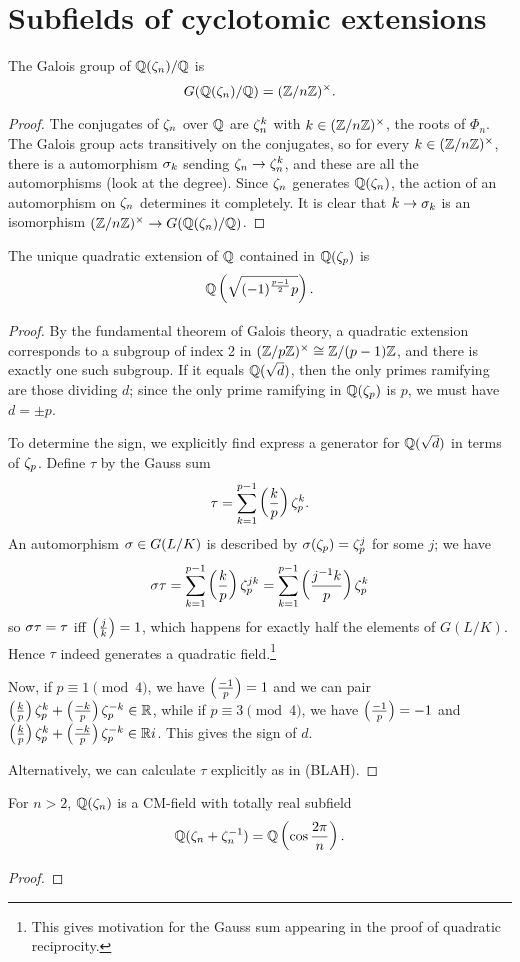\section{Subfields of cyclotomic extensions}
\begin{pr}
The Galois group of $\mathbb{Q}(\zeta_n)/\mathbb{Q}$ is
\[
G(\mathbb{Q}(\zeta_n)/\mathbb{Q})=(\mathbb{Z}/n\mathbb{Z})^{\times}.
\]
\end{pr}
\begin{proof}
The conjugates of $\zeta_n$ over $\mathbb{Q}$ are $\zeta_n^k$ with $k\in (\mathbb{Z}/n\mathbb{Z})^{\times}$, the roots of $\Phi_n$. The Galois group acts transitively on the conjugates, so for every $k\in (\mathbb{Z}/n\mathbb{Z})^{\times}$, there is a automorphism $\sigma_k$ sending $\zeta_n\to \zeta_n^k$, and these are all the automorphisms (look at the degree). Since $\zeta_n$ generates $\mathbb{Q}(\zeta_n)$, the action of an automorphism on $\zeta_n$ determines it completely. It is clear that $k\to \sigma_k$ is an isomorphism $(\mathbb{Z}/n\mathbb{Z})^{\times}\to G(\mathbb{Q}(\zeta_n)/\mathbb{Q})$.
\end{proof}
\begin{pr}
The unique quadratic extension of $\mathbb{Q}$ contained in $\mathbb{Q}(\zeta_p)$ is
\[
\mathbb{Q}\left( {\sqrt{(-1)^{\frac{p-1}{2}}p}} \right).
\]
\end{pr}
\begin{proof}
By the fundamental theorem of Galois theory, a quadratic extension corresponds to a subgroup of index 2 in $(\mathbb{Z}/p\mathbb{Z})^{\times}\cong \mathbb{Z}/(p-1)\mathbb{Z}$, and there is exactly one such subgroup. If it equals $\mathbb{Q}(\sqrt{d})$, then the only primes ramifying are those dividing $d$; since the only prime ramifying in $\mathbb{Q}(\zeta_p)$ is $p$, we must have $d=\pm p$.

To determine the sign, we explicitly find express a generator for $\mathbb{Q}(\sqrt{d})$ in terms of $\zeta_p$. Define $\tau$ by the Gauss sum
\[
\tau=\sum_{k=1}^{p-1} \left( {\frac{k}{p}} \right)\zeta_p^k.
\]
An automorphism $\sigma\in G(L/K)$ is described by $\sigma(\zeta_p)=\zeta_p^j$ for some $j$; we have
\[
\sigma \tau=\sum_{k=1}^{p-1} \left( {\frac{k}{p}} \right)\zeta_p^{jk}
=\sum_{k=1}^{p-1} \left( {\frac{j^{-1}k}{p}} \right)\zeta_p^{k}
\]
so $\sigma\tau=\tau$ iff $\left( {\frac{j}{k}} \right)=1$, which happens for exactly half the elements of $G(L/K)$. Hence $\tau$ indeed generates a quadratic field.\footnote{This gives motivation for the Gauss sum appearing in the proof of quadratic reciprocity.}

Now, if $p\equiv 1\pmod 4$, we have $\left( {\frac{-1}{p}} \right)=1$ and we can pair $\left( {\frac{k}{p}} \right)\zeta_p^k+\left( {\frac{-k}{p}} \right)\zeta_p^{-k}\in \mathbb{R}$, while if $p\equiv 3\pmod 4$, we have $\left( {\frac{-1}{p}} \right)=-1$ and $\left( {\frac{k}{p}} \right)\zeta_p^k+\left( {\frac{-k}{p}} \right)\zeta_p^{-k}\in \mathbb{R} i$. This gives the sign of $d$.

Alternatively, we can calculate $\tau$ explicitly as in (BLAH).
\end{proof}
\begin{pr}
For $n>2$, $\mathbb{Q}(\zeta_n)$ is a CM-field with totally real subfield
\[
\mathbb{Q}(\zeta_n+\zeta_n^{-1})=\mathbb{Q}\left( {\cos\frac{2\pi}{n}} \right).
\]
\end{pr}
\begin{proof}
\end{proof}
